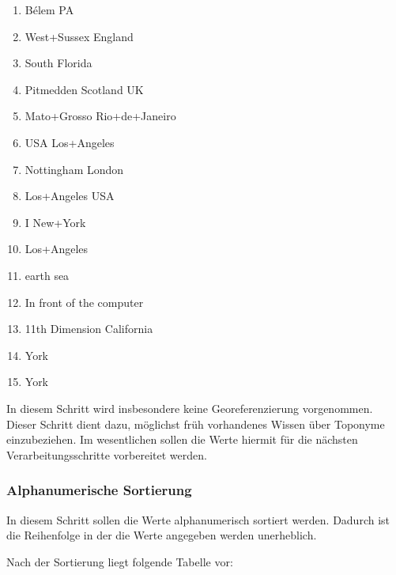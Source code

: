				\begin{multicols}{2}
					\begin{enumerate}
						\item Bélem PA
						\item West+Sussex England
						\item South Florida
						\item Pitmedden Scotland UK
						\item Mato+Grosso Rio+de+Janeiro
						\item USA Los+Angeles
						\item Nottingham London
						\item Los+Angeles USA
						\item I New+York 
						\item Los+Angeles
						\item earth sea
						\item In front of the computer
						\item 11th Dimension California
						\item York
						\item York
					\end{enumerate}
				\end{multicols}

				In diesem Schritt wird insbesondere keine Georeferenzierung vorgenommen. 
				Dieser Schritt dient dazu, möglichst früh vorhandenes Wissen über Toponyme einzubeziehen.
				Im wesentlichen sollen die Werte hiermit für die nächsten Verarbeitungsschritte vorbereitet werden.

			\subsubsection{Alphanumerische Sortierung}

				In diesem Schritt sollen die Werte alphanumerisch sortiert werden. 
				Dadurch ist die Reihenfolge in der die Werte angegeben werden unerheblich.

				Nach der Sortierung liegt folgende Tabelle vor:


